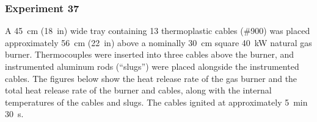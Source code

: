 \documentclass[12pt]{article}
\begin{document}
\clearpage

\subsubsection{Experiment 37}

A 45~cm (18~in) wide tray containing 13 thermoplastic cables (\#900) was placed approximately 56~cm (22~in) above a nominally 30~cm square 40~kW natural gas burner. Thermocouples were inserted into three cables above the burner, and instrumented aluminum rods (``slugs'') were placed alongside the instrumented cables. The figures below show the heat release rate of the gas burner and the total heat release rate of the burner and cables, along with the internal temperatures of the cables and slugs. The cables ignited at approximately 5~min 30~s.
\end{document}
